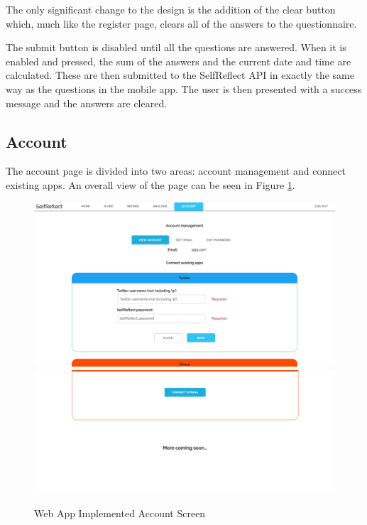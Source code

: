 \documentclass[11pt,openright,a4paper]{report}
\begin{document}
The only significant change to the design is the addition of the clear button which, much like the register page, clears all of the answers to the questionnaire.

The submit button is disabled until all the questions are answered. When it is enabled and pressed, the sum of the answers and the current date and time are calculated. These are then submitted to the SelfReflect API in exactly the same way as the questions in the mobile app. The user is then presented with a success message and the answers are cleared.

\subsection{Account}
The account page is divided into two areas: account management and connect existing apps. An overall view of the page can be seen in Figure \ref{fig:webaccountimpl}.

\begin{figure}[ht]
\centering
\caption{Web App Implemented Account Screen}
\includegraphics[width=.75\textwidth]{i/webaccountimpltop.png}
\includegraphics[width=.75\textwidth]{i/webaccountimplbottom.png}
\label{fig:webaccountimpl}
\end{figure}

\newpage
\end{document}
